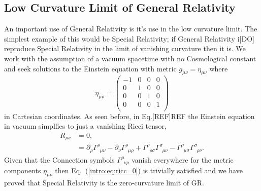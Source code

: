 \subsection{Low Curvature Limit of General Relativity}
An important use of General Relativity is it's use in the low curvature limit. The simplest example of this would be Special Relativity; if General Relativity i[DO] reproduce Special Relativity in the limit of vanishing curvature then it is. We work with the assumption of a vacuum spacetime with no Cosmological constant and seek solutions to the Einstein equation with metric $g_{\mu\nu} = \eta_{\mu\nu}$ where 
\begin{equation}
\eta_{\mu\nu} = \begin{pmatrix} -1 & 0 & 0 & 0 \\ 0 & 1 & 0 & 0 \\ 0 & 0 & 1 & 0 \\ 0 & 0 & 0 & 1 \\\end{pmatrix}
\end{equation}
in Cartesian coordinates. As seen before, in Eq.[REF]REF the Einstein equation in vacuum simplfies to just a vanishing Ricci tensor,
\begin{align} \label{intro:eq:ricc=0}
R_{\mu\nu} &= 0 ,\\
           &= \partial_{\rho}\Gamma^{\rho}_{\,\,\,\mu \nu}-\partial_{\nu}\Gamma^{\rho}_{\,\,\,\mu \rho} + \Gamma^{\rho}_{\,\,\, \rho\sigma}\Gamma^{\sigma}_{\,\,\,\mu \nu}-\Gamma^{\rho}_{\,\,\,\mu \sigma}\Gamma^{\sigma}_{\,\,\, \rho\nu}.
\end{align}
Given that the Connection symbols $\Gamma^\mu_{\,\,\,\nu\rho}$ vanish everywhere for the metric components ${\eta}_{\mu\nu}$ then Eq.~(\ref{intro:eq:ricc=0}) is trivially satisfied and we have proved that Special Relativity is the zero-curvature limit of GR.

